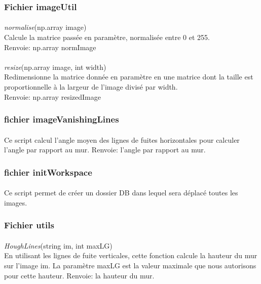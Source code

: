 \documentclass[12pt]{report}
\begin{document}
\subsubsection{Fichier imageUtil}

\paragraph{}
\textit{normalise}(np.array image)\\
Calcule la matrice passée en paramètre, normalisée entre 0 et 255.\\
Renvoie: np.array normImage

\paragraph{}
\textit{resize}(np.array image, int width)\\
Redimensionne la matrice donnée en paramètre en une matrice dont la taille est proportionnelle à la largeur de l'image divisé par width.\\
Renvoie: np.array resizedImage

\subsubsection{fichier imageVanishingLines}

\paragraph{}
Ce script calcul l'angle moyen des lignes de fuites horizontales pour calculer l'angle par rapport au mur.
Renvoie: l'angle par rapport au mur.

\subsubsection{fichier initWorkspace}

\paragraph{}
Ce script permet de créer un dossier DB dans lequel sera déplacé toutes les images.

\subsubsection{Fichier utils}
\paragraph{}
\textit{HoughLines}(string im, int maxLG)\\
En utilisant les lignes de fuite verticales, cette fonction calcule la hauteur du mur sur l'image im. La paramètre maxLG est la valeur maximale que nous autorisons pour cette hauteur.
Renvoie: la hauteur du mur.
\end{document}
